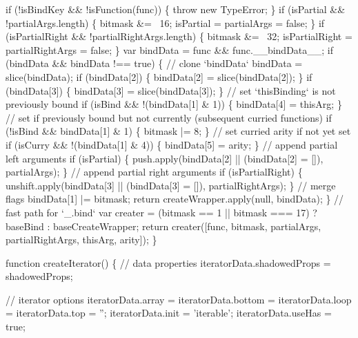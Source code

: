 \begin{DoxyCodeInclude}
      \textcolor{keywordflow}{if} (!isBindKey && !isFunction(func)) \{
        \textcolor{keywordflow}{throw} \textcolor{keyword}{new} TypeError;
      \}
      \textcolor{keywordflow}{if} (isPartial && !partialArgs.length) \{
        bitmask &= ~16;
        isPartial = partialArgs = \textcolor{keyword}{false};
      \}
      \textcolor{keywordflow}{if} (isPartialRight && !partialRightArgs.length) \{
        bitmask &= ~32;
        isPartialRight = partialRightArgs = \textcolor{keyword}{false};
      \}
      var bindData = func && func.\_\_bindData\_\_;
      \textcolor{keywordflow}{if} (bindData && bindData !== \textcolor{keyword}{true}) \{
        \textcolor{comment}{// clone `bindData`}
        bindData = slice(bindData);
        \textcolor{keywordflow}{if} (bindData[2]) \{
          bindData[2] = slice(bindData[2]);
        \}
        \textcolor{keywordflow}{if} (bindData[3]) \{
          bindData[3] = slice(bindData[3]);
        \}
        \textcolor{comment}{// set `thisBinding` is not previously bound}
        \textcolor{keywordflow}{if} (isBind && !(bindData[1] & 1)) \{
          bindData[4] = thisArg;
        \}
        \textcolor{comment}{// set if previously bound but not currently (subsequent curried functions)}
        \textcolor{keywordflow}{if} (!isBind && bindData[1] & 1) \{
          bitmask |= 8;
        \}
        \textcolor{comment}{// set curried arity if not yet set}
        \textcolor{keywordflow}{if} (isCurry && !(bindData[1] & 4)) \{
          bindData[5] = arity;
        \}
        \textcolor{comment}{// append partial left arguments}
        \textcolor{keywordflow}{if} (isPartial) \{
          push.apply(bindData[2] || (bindData[2] = []), partialArgs);
        \}
        \textcolor{comment}{// append partial right arguments}
        \textcolor{keywordflow}{if} (isPartialRight) \{
          unshift.apply(bindData[3] || (bindData[3] = []), partialRightArgs);
        \}
        \textcolor{comment}{// merge flags}
        bindData[1] |= bitmask;
        \textcolor{keywordflow}{return} createWrapper.apply(null, bindData);
      \}
      \textcolor{comment}{// fast path for `\_.bind`}
      var creater = (bitmask == 1 || bitmask === 17) ? baseBind : baseCreateWrapper;
      \textcolor{keywordflow}{return} creater([func, bitmask, partialArgs, partialRightArgs, thisArg, arity]);
    \}

    \textcolor{keyword}{function} createIterator() \{
      \textcolor{comment}{// data properties}
      iteratorData.shadowedProps = shadowedProps;

      \textcolor{comment}{// iterator options}
      iteratorData.array = iteratorData.bottom = iteratorData.loop = iteratorData.top = \textcolor{stringliteral}{''};
      iteratorData.init = \textcolor{stringliteral}{'iterable'};
      iteratorData.useHas = \textcolor{keyword}{true};


\end{DoxyCodeInclude}
